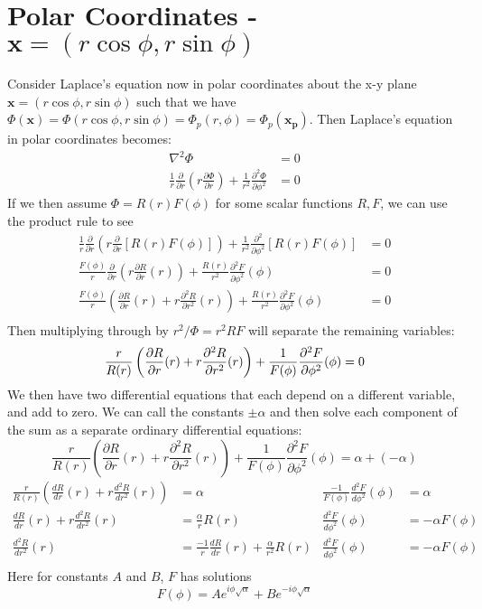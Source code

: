 \documentclass{article}	%
\theoremstyle{definition}
\begin{document}
\section{Polar Coordinates - $\mathbf{x}=(r\cos\phi,r\sin\phi)$}
Consider Laplace's equation now in polar coordinates about the x-y plane $\mathbf{x} = (r\cos\phi,r\sin\phi)$ such that we have $\Phi(\mathbf{x})=\Phi(r\cos\phi,r\sin\phi)=\Phi_{p}(r,\phi)=\Phi_{p}(\mathbf{x_{p}})$. Then Laplace's equation in polar coordinates becomes:
\begin{align*}
\nabla^{2} \Phi &= 0\\
\frac{1}{r} \frac{\partial}{\partial r} \left( r \frac{\partial \Phi}{\partial r} \right) + \frac{1}{r^{2}} \frac{\partial^{2} \Phi}{\partial \phi^{2}} &= 0
\end{align*}
If we then assume $\Phi=R(r)F(\phi)$ for some scalar functions $R,F$, we can use the product rule to see
\begin{align*}
\frac{1}{r} \frac{\partial}{\partial r} \left( r \frac{\partial}{\partial r} \left[ R(r)F(\phi) \right] \right) + \frac{1}{r^{2}} \frac{\partial^{2}}{\partial \phi^{2}} \left[ R(r)F(\phi) \right] &= 0\\
\frac{F(\phi)}{r} \frac{\partial}{\partial r} \left( r \frac{\partial R}{\partial r}(r) \right) + \frac{R(r)}{r^{2}} \frac{\partial^{2} F}{\partial \phi^{2}}(\phi) &= 0\\
\frac{F(\phi)}{r} \left( \frac{\partial R}{\partial r}(r) +  r \frac{\partial^{2} R}{\partial r^{2}}(r) \right) + \frac{R(r)}{r^{2}} \frac{\partial^{2} F}{\partial \phi^{2}}(\phi) &= 0\\
\end{align*}
Then multiplying through by $r^{2}/\Phi = r^{2}RF$ will separate the remaining variables:
\[ \frac{r}{R(r)} \left( \frac{\partial R}{\partial r}(r) +  r \frac{\partial^{2} R}{\partial r^{2}}(r) \right) + \frac{1}{F(\phi)} \frac{\partial^{2} F}{\partial \phi^{2}}(\phi) = 0\\ \]
We then have two differential equations that each depend on a different variable, and add to zero. We can call the constants $\pm\alpha$ and then solve each component of the sum as a separate ordinary differential equations:
\[ \frac{r}{R(r)} \left( \frac{\partial R}{\partial r}(r) + r \frac{\partial^{2} R}{\partial r^{2}}(r) \right) + \frac{1}{F(\phi)} \frac{\partial^{2} F}{\partial \phi^{2}}(\phi) = \alpha + (-\alpha) \]
\begin{align*}
\frac{r}{R(r)} \left( \frac{dR}{dr}(r) + r \frac{d^{2} R}{dr^{2}}(r) \right) &= \alpha
&
\frac{-1}{F(\phi)} \frac{d^{2} F}{d\phi^{2}}(\phi) &= \alpha\\
\frac{dR}{dr}(r) + r \frac{d^{2} R}{dr^{2}}(r) &= \frac{\alpha}{r} R(r)
&
\frac{d^{2} F}{d\phi^{2}}(\phi) &= -\alpha F(\phi)\\
\frac{d^{2} R}{d r^{2}}(r) &= \frac{-1}{r} \frac{d R}{d r}(r) + \frac{\alpha}{r^{2}} R(r)
&
\frac{d^{2} F}{d \phi^{2}}(\phi) &= -\alpha F(\phi)\\
\end{align*}
Here for constants $A$ and $B$, $F$ has solutions
\[ F(\phi)= Ae^{i\phi\sqrt{\alpha}} + Be^{-i\phi\sqrt{\alpha}} \]
\end{document}
